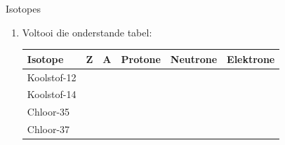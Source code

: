 \begin{exercises}  {Isotopes }
\begin{enumerate}[noitemsep, label=\textbf{\arabic*}. ]
\begin{enumerate}[noitemsep, label=\textbf{\alph*}. ]
\label{m38753*uid67}\item $_{92}^{235}\text{X}$
\end{enumerate}
            \label{m38753*uid619}\item Voltooi die onderstande tabel:
          \begin{center}
\begin{tabular}{|p{2cm}|p{1cm}|p{1cm}|p{1.4cm}|p{1.4cm}|p{1.4cm}|}\hline
\textbf{Isotope} & \textbf{Z} & \textbf{A} & \textbf{Protone} & \textbf{Neutrone} & \textbf{Elektrone}\\\hline
Koolstof-12 & & & & & \\\hline
Koolstof-14 & & & & & \\\hline
Chloor-35 & & & & & \\\hline
Chloor-37 & & & & & \\\hline
\end{tabular}
\end{center}


\end{enumerate}
\end{exercises}
